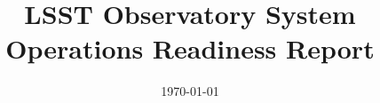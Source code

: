 \documentclass[modern]{aastex62}
\begin{document}

\date{\today}


\title{ LSST Observatory System Operations Readiness Report}







\end{document}
